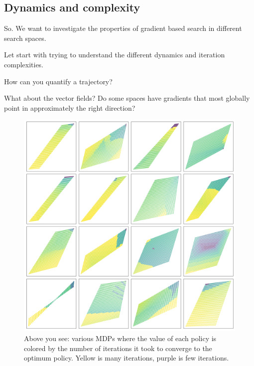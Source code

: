 \subsection{Dynamics and complexity}

\begin{displayquote}
So. We want to investigate the properties of gradient based search in different search spaces.
\end{displayquote}

Let start with trying to understand the different dynamics and iteration complexities.

How can you quantify a trajectory?

What about the vector fields?
Do some spaces have gradients that most globally point in approximately the right direction?



\begin{figure}
\centering
\includegraphics[width=1\textwidth,height=1\textheight]{../../pictures/figures/mvi-iterations.png}
\caption{Above you see: various MDPs where the value of each policy is colored
by the number of iterations it took to converge to the optimum policy. Yellow is many iterations, purple is few iterations.}
\end{figure}

